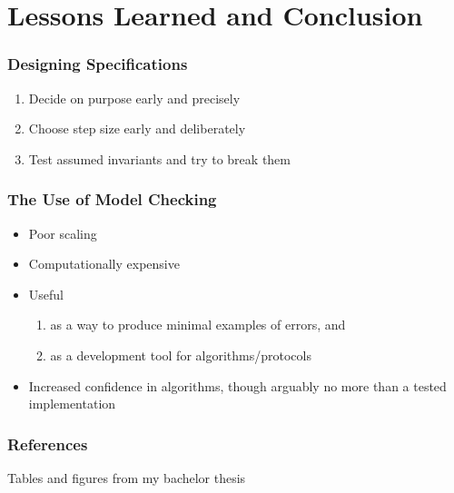 \documentclass{beamer}
\begin{document}
\section{Lessons Learned and Conclusion}
\begin{frame}
  \frametitle{Designing Specifications}
  \begin{enumerate}
  \item Decide on purpose early and precisely
  \item Choose step size early and deliberately
  \item Test assumed invariants and try to break them
  \end{enumerate}
  
\end{frame}
\begin{frame}
  \frametitle{The Use of Model Checking}
  \begin{itemize}
  \item Poor scaling
  \item Computationally expensive
  \item Useful
    \begin{enumerate}
    \item as a way  to produce minimal examples of errors, and
    \item as a development tool for algorithms/protocols
    \end{enumerate}
  \item Increased confidence in algorithms, though arguably no more than a
    tested implementation
  \end{itemize}
\end{frame}

\begin{frame}
  \frametitle{References}
  Tables and figures from my bachelor thesis~\cite{Klovstad2020}
  \printbibliography{}
\end{frame}
\end{document}
